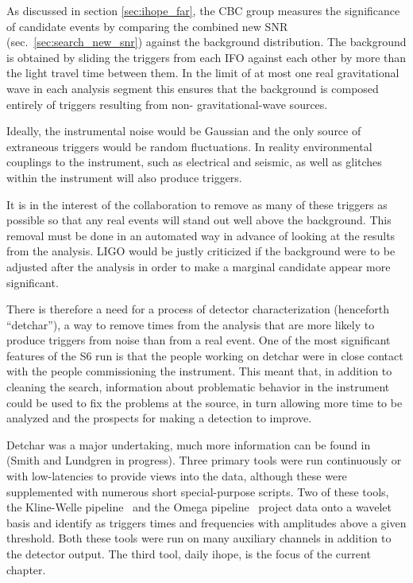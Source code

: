 \newcommand\weakheader[1]{
\vspace*{5mm}
\noindent {\it #1}
\vspace*{5mm}
}

\newcommand{\darmerr}{{\texttt DARM\_ERR} }

As discussed in section \ref{sec:ihope_far}, the CBC group measures
the significance of candidate events by comparing the combined new SNR
(sec.~\ref{sec:search_new_snr}) against the background distribution.
The background is obtained by sliding the triggers from each IFO
against each other by more than the light travel time between them.
In the limit of at most one real gravitational wave in each analysis
segment this ensures that the background is composed entirely of
triggers resulting from non- gravitational-wave sources.

Ideally, the instrumental noise would be Gaussian and the only source
of extraneous triggers would be random fluctuations.  In reality
environmental couplings to the instrument, such as electrical and
seismic, as well as glitches within the instrument will also produce
triggers.

It is in the interest of the collaboration to remove as many of these
triggers as possible so that any real events will stand out 
well above the background.  This removal must be done in
an automated way in advance of looking at the results from the
analysis.  LIGO would be justly criticized if the background were
to be adjusted after the analysis in order to make a marginal candidate
appear more significant.

There is therefore a need for a process of detector characterization
(henceforth ``detchar''), a way to remove times from the analysis that
are more likely to produce triggers from noise than from a real event.
One of the most significant features of the S6 run is that the people
working on detchar were in close contact with the people commissioning
the instrument.  This meant that, in addition to cleaning the search,
information about problematic behavior in the instrument could be used
to fix the problems at the source, in turn allowing more time to be
analyzed and the prospects for making a detection to improve.

Detchar was a major undertaking, much more information can be found in
(Smith and Lundgren in progress).  Three primary tools were run
continuously or with low-latencies to provide views into the data,
although these were supplemented with numerous short special-purpose
scripts.  Two of these tools, the Kline-Welle pipeline~\cite{} and the
Omega pipeline~\cite{} project data onto a wavelet basis and identify
as triggers times and frequencies with amplitudes above a given
threshold.  Both these tools were run on many auxiliary channels in
addition to the detector output.  The third tool, daily ihope, is the
focus of the current chapter.


